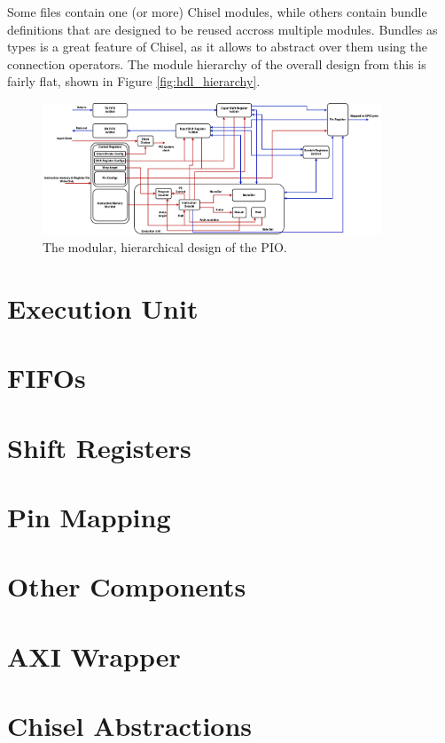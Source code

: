 Some files contain one (or more) Chisel modules, while others contain bundle definitions that are designed to be reused accross multiple modules. Bundles as types is a great feature of Chisel, as it allows to abstract over them using the connection operators. The module hierarchy of the overall design from this is fairly flat, shown in Figure \ref{fig:hdl_hierarchy}.

\begin{figure}[H]
    \centering
    \includegraphics[width=0.9\textwidth]{../img/bd.png}
    \caption{The modular, hierarchical design of the PIO.}
    \label{fig:vivado-bd}
\end{figure}

\section{Execution Unit}

\section{FIFOs}

\section{Shift Registers}

\section{Pin Mapping}

\section{Other Components}

\section{AXI Wrapper}

\section{Chisel Abstractions}